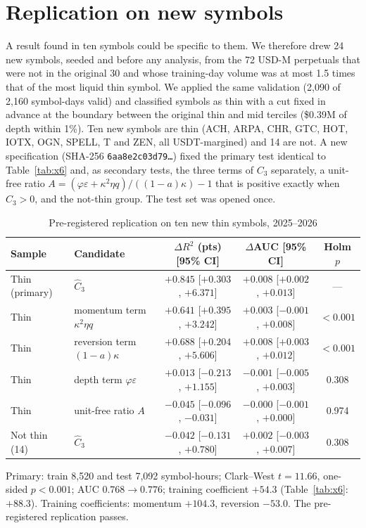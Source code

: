 \documentclass[12pt]{article}
\theoremstyle{definition}
\theoremstyle{remark}
\begin{document}
\section{Replication on new symbols}
A result found in ten symbols could be specific to them. We therefore drew 24 new symbols, seeded and before any analysis, from the 72 USD-M perpetuals that were not in the original 30 and whose training-day volume was at most 1.5 times that of the most liquid thin symbol. We applied the same validation (2{,}090 of 2{,}160 symbol-days valid) and classified symbols as thin with a cut fixed in advance at the boundary between the original thin and mid terciles (\$0.39M of depth within 1\%). Ten new symbols are thin (ACH, ARPA, CHR, GTC, HOT, IOTX, OGN, SPELL, T and ZEN, all USDT-margined) and 14 are not. A new specification (SHA-256 \texttt{6aa8e2c03d79\ldots}) fixed the primary test identical to Table~\ref{tab:x6} and, as secondary tests, the three terms of $C_3$ separately, a unit-free ratio $A=(\varphi\varepsilon+\kappa^2\eta q)/((1-a)\kappa)-1$ that is positive exactly when $C_3>0$, and the not-thin group. The test set was opened once.

\begin{table}[t]\centering
\begin{threeparttable}
\caption{Pre-registered replication on ten new thin symbols, 2025--2026}\label{tab:y6}
\small\setlength{\tabcolsep}{4pt}
\begin{tabular}{llccc}
\toprule
Sample & Candidate & $\Delta R^2$ (pts) [95\% CI] & $\Delta$AUC [95\% CI] & Holm $p$\\
\midrule
Thin (primary) & $\hat C_3$ & $+0.845$ [$+0.303$, $+6.371$] & $+0.008$ [$+0.002$, $+0.013$] & ---\\
Thin & momentum term $\kappa^2\eta q$ & $+0.641$ [$+0.395$, $+3.242$] & $+0.003$ [$-0.001$, $+0.008$] & $<0.001$\\
Thin & reversion term $(1-a)\kappa$ & $+0.688$ [$+0.204$, $+5.606$] & $+0.008$ [$+0.003$, $+0.012$] & $<0.001$\\
Thin & depth term $\varphi\varepsilon$ & $+0.013$ [$-0.213$, $+1.155$] & $-0.001$ [$-0.005$, $+0.003$] & 0.308\\
Thin & unit-free ratio $A$ & $-0.045$ [$-0.096$, $-0.031$] & $-0.000$ [$-0.001$, $+0.000$] & 0.974\\
Not thin (14) & $\hat C_3$ & $-0.042$ [$-0.131$, $+0.780$] & $+0.002$ [$-0.003$, $+0.007$] & 0.308\\
\bottomrule
\end{tabular}
\begin{tablenotes}\footnotesize\item Primary: train 8{,}520 and test 7{,}092 symbol-hours; Clark--West $t=11.66$, one-sided $p<0.001$; AUC $0.768\to0.776$; training coefficient $+54.3$ (Table~\ref{tab:x6}: $+88.3$). Training coefficients: momentum $+104.3$, reversion $-53.0$. The pre-registered replication passes. \end{tablenotes}
\end{threeparttable}
\end{table}
\end{document}
